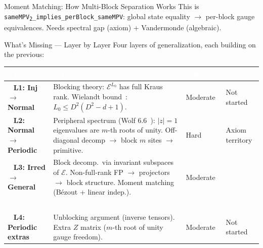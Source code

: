 \documentclass[aspectratio=169,10pt]{beamer}
\begin{document}
\begin{frame}{Moment Matching: How Multi-Block Separation Works}
    \vspace{0.05em}
    {\scriptsize\textcolor{dimwhite}{%
    This is \texttt{sameMPV\textsubscript{2}\_implies\_perBlock\_sameMPV}:
    global state equality $\to$ per-block gauge equivalences.
    Needs spectral gap (axiom) + Vandermonde (algebraic).}}
\end{frame}

\begin{frame}{What's Missing --- Layer by Layer}
    \vspace{-0.8em}
    {\small Four layers of generalization, each building on the previous:}

    \vspace{0.05em}
    \renewcommand{\arraystretch}{0.9}
    {\scriptsize
    \begin{tabular}{@{}>{\ \bfseries\color{white}}p{2.7cm}
                    p{5.8cm}
                    >{\centering\arraybackslash}p{1.4cm}
                    >{\centering\arraybackslash}p{1.4cm}@{}}
        \toprule
        \rowcolor{cardbg}
        \textcolor{white}{Layer} &
        \textcolor{white}{What's needed} &
        \textcolor{white}{Difficulty} &
        \textcolor{white}{Status} \\
        \midrule
        \rowcolor{cardbg}
        \textcolor{amber}{L1: Inj $\to$ Normal} &
        \textcolor{dimwhite}{Blocking theory: $\mathcal{E}^{L_0}$ has full Kraus rank.
        Wielandt bound~\cite{Sanz2010Quantum}: $L_0 \leq D^2(D^2-d+1)$.} &
        \textcolor{amber}{Moderate} &
        \textcolor{softred}{Not started} \\
        \rowcolor{cardbg}
        \textcolor{leanblue}{L2: Normal $\to$ Periodic} &
        \textcolor{dimwhite}{Peripheral spectrum (Wolf 6.6~\cite{Wolf2012Quantum}):
        $|z|{=}1$ eigenvalues are $m$-th roots of unity.
        Off-diagonal decomp $\to$ block $m$ sites $\to$ primitive.} &
        \textcolor{softred}{Hard} &
        \textcolor{softred}{Axiom territory} \\
        \rowcolor{cardbg}
        \textcolor{leangreen}{L3: Irred $\to$ General} &
        \textcolor{dimwhite}{Block decomp.\ via invariant subspaces of $\mathcal{E}$.
        Non-full-rank FP $\to$ projectors $\to$ block structure.
        Moment matching (B\'ezout + linear indep.).} &
        \textcolor{amber}{Moderate} &
        \shortstack{\textcolor{amber}{Partial}\\{\tiny block perm.\ \textcolor{leangreen}{\checkmark}}} \\
        \rowcolor{cardbg}
        \textcolor{mintgreen}{L4: Periodic extras} &
        \textcolor{dimwhite}{Unblocking argument (inverse tensors).
        Extra $Z$ matrix ($m$-th root of unity gauge freedom).} &
        \textcolor{amber}{Moderate} &
        \textcolor{softred}{Not started} \\
        \bottomrule
    \end{tabular}
    }


\end{frame}
\end{document}
